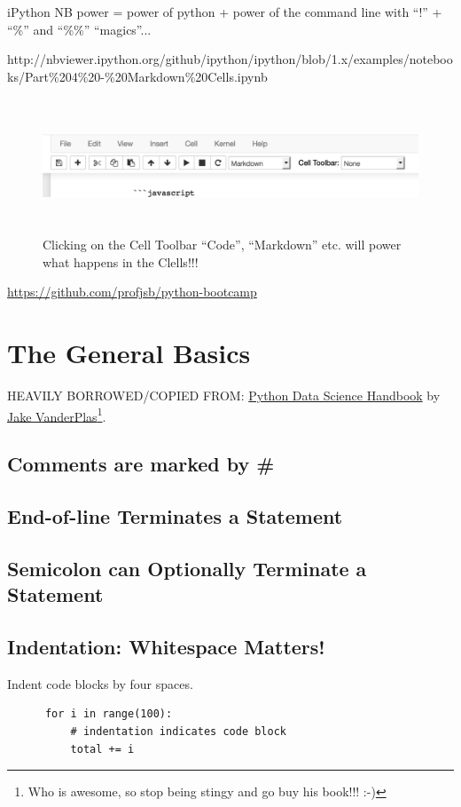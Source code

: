 \documentclass[11pt,a4paper]{article}
\begin{document}
    iPython NB power = power of python + power of the command line with ``!'' + ``\%'' and ``\%\%'' ``magics''... 
    
http://nbviewer.ipython.org/github/ipython/ipython/blob/1.x/examples/notebooks/Part\%204\%20-\%20Markdown\%20Cells.ipynb

\begin{figure}
  \includegraphics[height=4.0cm,width=14.0cm]
  {images/iPython_NB_toolbar.pdf}
  \centering
  \caption[]
  {Clicking on the Cell Toolbar ``Code'', ``Markdown'' etc. will power what happens in the Clells!!!}
  \label{fig:fig1}
\end{figure}
\href{https://github.com/profjsb/python-bootcamp}{https://github.com/profjsb/python-bootcamp}


\newpage
\section{The General Basics}
HEAVILY BORROWED/COPIED FROM: 
\href{http://shop.oreilly.com/product/0636920034919.do}{Python Data Science Handbook} by
\href{https://jakevdp.github.io/}{Jake VanderPlas}\footnote{Who is awesome, so stop being stingy and go buy his book!!! :-)}. 

\subsection*{Comments are marked by \#}

\subsection*{End-of-line Terminates a Statement}
\subsection*{Semicolon can Optionally Terminate a Statement}   

    \subsection*{Indentation: Whitespace Matters!}
    Indent code blocks by four spaces. 
    \begin{lstlisting}
      for i in range(100):
          # indentation indicates code block 
          total += i
    \end{lstlisting}
    
\end{document}
